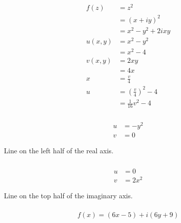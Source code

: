 \documentclass{article}
\begin{document}
\subsubsection{}

\begin{align*}
  f(z)    & = z^2                              \\
          & = (x + i y)^2                      \\
          & = x^2 - y^2 + 2 i x y              \\
  u(x, y) & = x^2 - y^2                        \\
          & = x^2 - 4                          \\
  v(x, y) & = 2 x y                            \\
          & = 4 x                              \\
  x       & = \frac{v}{4}                      \\
  u       & = \left( \frac{v}{4} \right)^2 - 4 \\
          & = \frac{1}{16} v^2 - 4
\end{align*}

\setcounter{subsubsection}{2}
\subsubsection{}

\begin{align*}
  u & = -y^2 \\
  v & = 0
\end{align*}

Line on the left half of the real axis.

\setcounter{subsubsection}{4}
\subsubsection{}

\begin{align*}
  u & = 0     \\
  v & = 2 x^2
\end{align*}

Line on the top half of the imaginary axis.

\setcounter{subsubsection}{6}
\subsubsection{}

\[f(x) = (6 x - 5) + i (6 y + 9)\]
\end{document}
